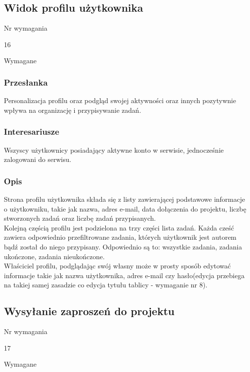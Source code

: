 \documentclass[eng,printmode]{mgr}
\begin{document}
\subsection{Widok profilu użytkownika}
\begin{labeling}{Nr wymagania}
\item [Nr wymagania:] 16
\item [Priorytet:] Wymagane
\end{labeling}

\subsubsection{Przesłanka}
Personalizacja profilu oraz podgląd swojej aktywności oraz innych pozytywnie wpływa na organizację i przypisywanie zadań. 

\subsubsection{Interesariusze}
Wszyscy użytkownicy posiadający aktywne konto w serwisie, jednocześnie zalogowani do serwisu.

\subsubsection{Opis}
Strona profilu użytkownika składa się z listy zawierającej podstawowe informacje o użytkowniku, takie jak nazwa, adres e-mail, data dołączenia do projektu, liczbę stworzonych zadań oraz liczbę zadań przypisanych. \\
Kolejną częścią profilu jest podzielona na trzy części lista zadań. Każda cześć zawiera odpowiednio przefiltrowane zadania, których użytkownik jest autorem bądź został do niego przypisany. Odpowiednio są to: wszystkie zadania, zadania ukończone, zadania nieukończone. \\
Właściciel profilu, podglądając swój własny może w prosty sposób edytować informacje takie jak nazwa użytkownika, adres e-mail czy hasło(edycja przebiega na takiej samej zasadzie co edycja tytułu tablicy - wymaganie nr 8).

\subsection{Wysyłanie zaproszeń do projektu}
\begin{labeling}{Nr wymagania}
\item [Nr wymagania:] 17
\item [Priorytet:] Wymagane
\end{labeling}
\end{document}
